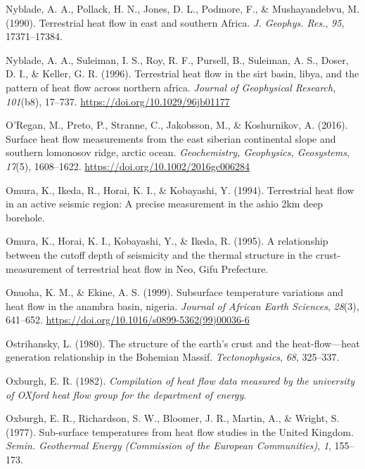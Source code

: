 \begin{CSLReferences}{1}{1}
\leavevmode{}%
Nyblade, A. A., Pollack, H. N., Jones, D. L., Podmore, F., \& Mushayandebvu, M. (1990). Terrestrial heat flow in east and southern {Africa}. \emph{J. Geophys. Res.}, \emph{95}, 17371--17384.

\leavevmode{}%
Nyblade, A. A., Suleiman, I. S., Roy, R. F., Pursell, B., Suleiman, A. S., Doser, D. I., \& Keller, G. R. (1996). Terrestrial heat flow in the sirt basin, libya, and the pattern of heat flow across northern africa. \emph{Journal of Geophysical Research}, \emph{101}(b8), 17--737. \url{https://doi.org/10.1029/96jb01177}

\leavevmode{}%
O'Regan, M., Preto, P., Stranne, C., Jakobsson, M., \& Koshurnikov, A. (2016). Surface heat flow measurements from the east siberian continental slope and southern lomonosov ridge, arctic ocean. \emph{Geochemistry, Geophysics, Geosystems}, \emph{17}(5), 1608--1622. \url{https://doi.org/10.1002/2016gc006284}

\leavevmode{}%
Omura, K., Ikeda, R., Horai, K. I., \& Kobayashi, Y. (1994). Terrestrial heat flow in an active seismic region: A precise measurement in the ashio 2km deep borehole.

\leavevmode{}%
Omura, K., Horai, K. I., Kobayashi, Y., \& Ikeda, R. (1995). A relationship between the cutoff depth of seismicity and the thermal structure in the crust-measurement of terrestrial heat flow in {Neo, Gifu Prefecture}.

\leavevmode{}%
Onuoha, K. M., \& Ekine, A. S. (1999). Subsurface temperature variations and heat flow in the anambra basin, nigeria. \emph{Journal of African Earth Sciences}, \emph{28}(3), 641--652. \url{https://doi.org/10.1016/s0899-5362(99)00036-6}

\leavevmode{}%
Ostrihansky, L. (1980). The structure of the earth's crust and the heat-flow---heat generation relationship in the {Bohemian Massif}. \emph{Tectonophysics}, \emph{68}, 325--337.

\leavevmode{}%
Oxburgh, E. R. (1982). \emph{Compilation of heat flow data measured by the university of OXford heat flow group for the department of energy}.

\leavevmode{}%
Oxburgh, E. R., Richardson, S. W., Bloomer, J. R., Martin, A., \& Wright, S. (1977). Sub-surface temperatures from heat flow studies in the {United Kingdom}. \emph{Semin. Geothermal Energy (Commission of the European Communities)}, \emph{1}, 155--173.


\end{CSLReferences}
